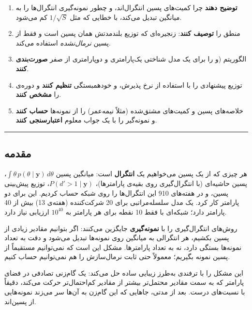 \begin{enumerate}
\def\labelenumi{\arabic{enumi}.}
\tightlist
\item
  \textbf{توضیح دهند} چرا کمیت‌های پسین انتگرال‌اند، و چطور نمونه‌گیری
   انتگرال‌ها را به میانگین تبدیل می‌کند، با خطایی که مثل
  \(1/\sqrt{S}\) کم می‌شود.
\item
  منطق  را \textbf{توصیف کنند}: زنجیره‌ای که
  توزیع بلندمدتش همان پسین است و فقط از پسین \emph{نرمال‌نشده} استفاده
  می‌کند.
\item
  الگوریتم  (و  را برای یک مدل
  شناختی یک‌پارامتری و دوپارامتری از صفر \textbf{صورت‌بندی کنند}.
\item
  توزیع پیشنهادی  را با استفاده از نرخ پذیرش،  و خودهمبستگی \textbf{تنظیم کنند} و دوره‌ی  را
  \textbf{مشخص کنند}.
\item
  خلاصه‌های پسین و کمیت‌های مشتق‌شده (مثلاً نیمه‌عمر) را از نمونه‌ها
  \textbf{حساب کنند} و نمونه‌گیر را با یک جواب معلوم \textbf{اعتبارسنجی
  کنند}.
\end{enumerate}

\begin{center}\rule{0.5\linewidth}{0.5pt}\end{center}

\subsection{مقدمه}

هر چیزی که از یک پسین می‌خواهیم یک \textbf{انتگرال} است: میانگین پسین
\(\int \theta\, p(\theta\mid\mathbf{y})\,d\theta\)، پسین حاشیه‌ای (با
انتگرال‌گیری روی بقیه‌ی پارامترها)، \(P(d' > 1\mid\mathbf{y})\)، توزیع
پیش‌بینی پسین، و  در هفته‌های 9\lr{--}10 این انتگرال‌ها
را روی شبکه حساب کردیم. این برای دو پارامتر کار کرد. یک مدل 
سلسله‌مراتبی برای 20 شرکت‌کننده (هفته‌ی 13) بیش از 40 پارامتر دارد؛ شبکه‌ای
با فقط 10 نقطه برای هر پارامتر به \(10^{40}\) ارزیابی نیاز دارد.

روش‌های \textbf{} انتگرال‌گیری را با \textbf{نمونه‌گیری}
جایگزین می‌کنند: اگر بتوانیم مقادیر زیادی از پسین بکشیم، هر انتگرالی به
میانگین روی نمونه‌ها تبدیل می‌شود و دقت به تعداد نمونه‌ها بستگی دارد، نه به
تعداد پارامترها. مشکل این است که نمی‌توانیم مستقیماً از پسین نمونه بگیریم؛
معمولاً حتی ثابت نرمال‌سازش را هم نمی‌توانیم حساب کنیم.

\textbf{} این مشکل را با ترفندی
به‌طرز زیبایی ساده حل می‌کند: یک گام‌زنی تصادفی در فضای پارامتر که به سمت
مقادیر محتمل‌تر بیشتر از مقادیر کم‌احتمال‌تر حرکت می‌کند، دقیقاً با نسبت‌های
درست. بعد از مدتی، جاهایی که این گام‌زن به آن‌ها سر می‌زند نمونه‌هایی از
پسین‌اند.

